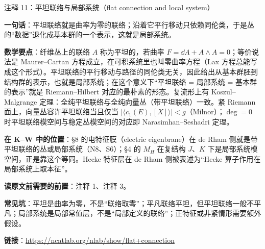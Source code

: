 \begin{kcard}{注释 11：平坦联络与局部系统（flat connection and local system）}

\textbf{一句话}：平坦联络就是曲率为零的联络；沿着它平行移动只依赖同伦类，于是丛的“数据”退化成基本群的一个表示，这就是局部系统。

\textbf{数学要点}：纤维丛上的联络 $A$ 称为平坦的，若曲率 $F=\dd A+A\wedge A=0$；等价说法是 Maurer--Cartan 方程成立，在可积系统里也叫零曲率方程（Lax 方程总能写成这个形式）。平坦联络的平行移动与路径的同伦类无关，因此给出从基本群胚到结构群的表示，也就是局部系统；在这个意义下“平坦联络 = 局部系统 = 基本群的表示”就是 Riemann--Hilbert 对应的最朴素的形态。复流形上有 Koszul--Malgrange 定理：全纯平坦联络与全纯向量丛（带平坦联络）一致。紧 Riemann 面上，向量丛容许平坦联络当且仅当 $|\langle c_1(E),[X]\rangle|<g$（Milnor）；$\deg=0$ 时平坦联络模空间与稳定丛模空间的对应即 Narasimhan--Seshadri 定理。

\textbf{在 K--W 中的位置}：§8 的电特征膜（electric eigenbrane）在 de Rham 侧就是带平坦联络的丛或局部系统（N8、S6）；§4 的 $M_H$ 在复结构 $J$、$K$ 下是局部系统模空间，正是靠这个等同。Hecke 特征层在 de Rham 侧被表述为“Hecke 算子作用在局部系统上取本征”。

\textbf{读原文前需要的前置}：注释 1、注释 3。

\textbf{常见坑}：平坦是曲率为零，不是“联络取零”；平凡联络平坦，但平坦联络一般不平凡；局部系统是局部常值层，不是“局部定义的联络”；正特征或非紧情形需要额外假设。

\noindent\textbf{链接}：\url{https://ncatlab.org/nlab/show/flat+connection}
\end{kcard}


